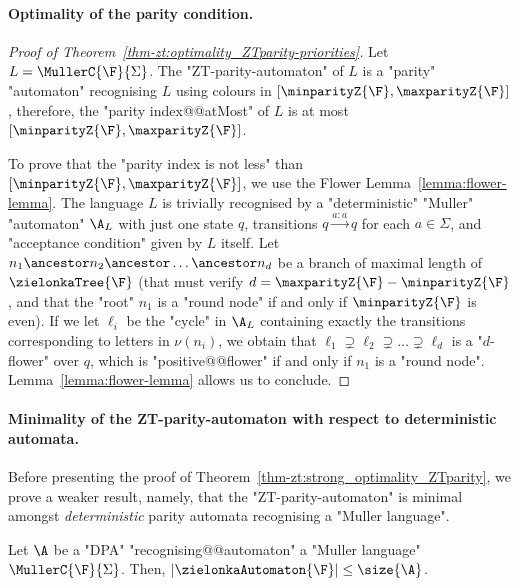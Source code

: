 \documentclass[10pt,a4paper]{amsart}
\renewcommand{\SS}{\Sigma}
\newcommand{\re}[1]{\xrightarrow{#1}}
\begin{document}
\paragraph*{Optimality of the parity condition.}
\begin{proof}[Proof of Theorem~\ref{thm-zt:optimality_ZTparity-priorities}]
	Let $L= \MullerC{\F}{\SS}$.
	The "ZT-parity-automaton" of $L$ is a "parity" "automaton" recognising $L$ using colours in $[\minparityZ{\F}, \maxparityZ{\F}]$, therefore, the "parity index@@atMost" of $L$ is at most $[\minparityZ{\F}, \maxparityZ{\F}]$.
	
	To prove that the "parity index is not less" than $[\minparityZ{\F}, \maxparityZ{\F}]$, we use the Flower Lemma~\ref{lemma:flower-lemma}. The language $L$ is trivially recognised by a "deterministic" "Muller" "automaton" $\A_L$ with just one state $q$, transitions $q\re{a:a}q$ for each $a\in \SS$, and "acceptance condition" given by $L$ itself. Let $n_1\ancestor n_2\ancestor \dots \ancestor n_d$ be a branch of maximal length of $\zielonkaTree{\F}$ (that must verify $d= \maxparityZ{\F} - \minparityZ{\F}$, and that the "root" $n_1$ is a "round node" if and only if $\minparityZ{\F}$ is even). If we let $\ell_i$ be the "cycle" in $\A_L$ containing exactly the transitions corresponding to letters in $\nu(n_i)$, we obtain that $\ell_1\supsetneq \ell_2\supsetneq \dots \supsetneq \ell_d$ is a "$d$-flower" over $q$, which is "positive@@flower" if and only if  $n_1$ is a "round node". Lemma~\ref{lemma:flower-lemma} allows us to conclude.
\end{proof}


\paragraph*{Minimality of the ZT-parity-automaton with respect to deterministic automata.}

Before presenting the proof of Theorem~\ref{thm-zt:strong_optimality_ZTparity}, we prove a weaker result, namely, that the "ZT-parity-automaton" is minimal amongst \emph{deterministic} parity automata recognising a "Muller language".


\begin{theorem}\label{thm-zt:weak_optimality_ZTparity}
	Let $\A$ be a "DPA"  "recognising@@automaton" a "Muller language" $\MullerC{\F}{\SS}$. Then, $|\zielonkaAutomaton{\F}| \leq \size{\A}$.
\end{theorem}
\end{document}

